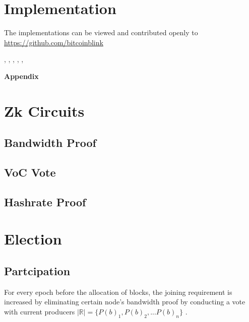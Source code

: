 \documentclass[a4paper,10pt]{article}
\begin{document}
\section{Implementation}
\noindent The implementations can be viewed and contributed openly to\\
\url{https://github.com/bitcoinblink}
\begin{center}
\nocite{nakamoto2008bitcoin}, \nocite{poon2016bitcoin} , \nocite{yakovenko2018solana}, \nocite{wood2014ethereum}, \nocite{rai2020}, \nocite{Stateful}
\end{center}


\vspace{5mm}
\appendix
\noindent \Large \textbf{Appendix}
\normalsize
\section{Zk Circuits}
\subsection{Bandwidth Proof}
\subsection{VoC Vote}
\subsection{Hashrate Proof}
\section{Election}

\subsection{Partcipation}

For every epoch before the allocation of blocks, the joining  requirement is increased by eliminating certain node's bandwidth proof by conducting a vote with current producers $|\mathbb{R}| = \{P(b)_1,P(b)_2,...P(b)_n\}$  . 
\end{document}
